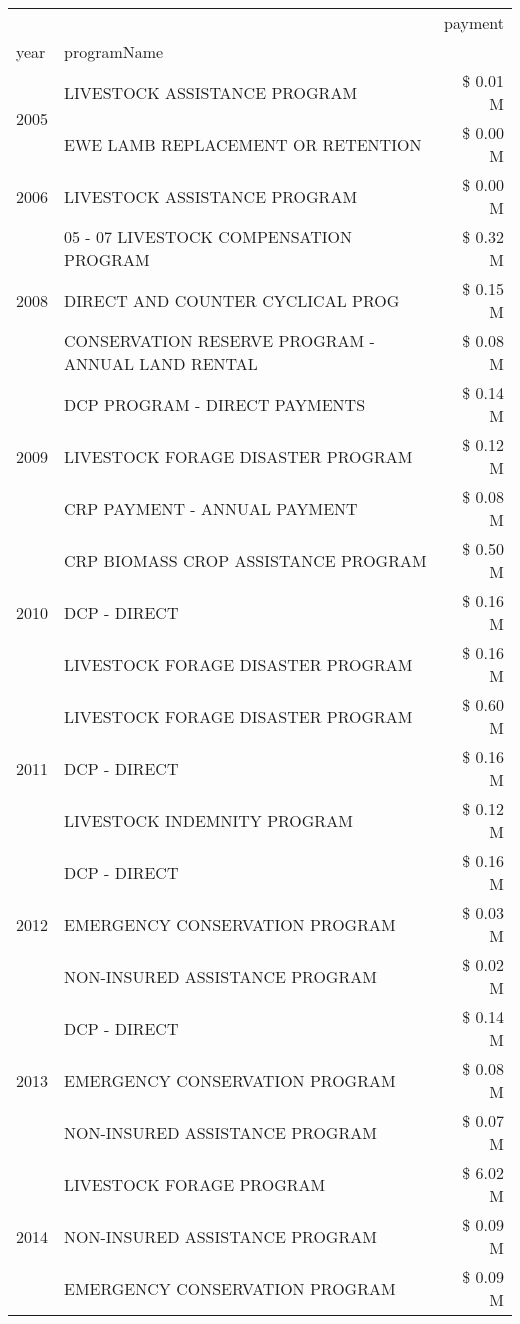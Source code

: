 \begin{tabular}{llr}
\toprule
 &  & payment \\
year & programName &  \\
\midrule
\multirow[t]{2}{*}{2005} & LIVESTOCK ASSISTANCE PROGRAM & \$ 0.01 M \\
 & EWE LAMB REPLACEMENT OR RETENTION & \$ 0.00 M \\
\cline{1-3}
2006 & LIVESTOCK ASSISTANCE PROGRAM & \$ 0.00 M \\
\cline{1-3}
\multirow[t]{3}{*}{2008} & 05 - 07 LIVESTOCK COMPENSATION PROGRAM & \$ 0.32 M \\
 & DIRECT AND COUNTER CYCLICAL PROG & \$ 0.15 M \\
 & CONSERVATION RESERVE PROGRAM - ANNUAL LAND RENTAL & \$ 0.08 M \\
\cline{1-3}
\multirow[t]{3}{*}{2009} & DCP PROGRAM - DIRECT PAYMENTS & \$ 0.14 M \\
 & LIVESTOCK FORAGE DISASTER  PROGRAM & \$ 0.12 M \\
 & CRP PAYMENT - ANNUAL PAYMENT & \$ 0.08 M \\
\cline{1-3}
\multirow[t]{3}{*}{2010} & CRP BIOMASS CROP ASSISTANCE PROGRAM & \$ 0.50 M \\
 & DCP - DIRECT & \$ 0.16 M \\
 & LIVESTOCK FORAGE DISASTER PROGRAM & \$ 0.16 M \\
\cline{1-3}
\multirow[t]{3}{*}{2011} & LIVESTOCK FORAGE DISASTER PROGRAM & \$ 0.60 M \\
 & DCP - DIRECT & \$ 0.16 M \\
 & LIVESTOCK INDEMNITY PROGRAM & \$ 0.12 M \\
\cline{1-3}
\multirow[t]{3}{*}{2012} & DCP - DIRECT & \$ 0.16 M \\
 & EMERGENCY CONSERVATION PROGRAM & \$ 0.03 M \\
 & NON-INSURED ASSISTANCE PROGRAM & \$ 0.02 M \\
\cline{1-3}
\multirow[t]{3}{*}{2013} & DCP - DIRECT & \$ 0.14 M \\
 & EMERGENCY CONSERVATION PROGRAM & \$ 0.08 M \\
 & NON-INSURED ASSISTANCE PROGRAM & \$ 0.07 M \\
\cline{1-3}
\multirow[t]{3}{*}{2014} & LIVESTOCK FORAGE PROGRAM & \$ 6.02 M \\
 & NON-INSURED ASSISTANCE PROGRAM & \$ 0.09 M \\
 & EMERGENCY CONSERVATION PROGRAM & \$ 0.09 M \\
\cline{1-3}

\end{tabular}
